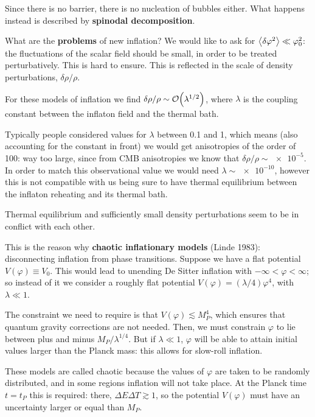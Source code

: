 \documentclass[main.tex]{subfiles}
\begin{document}
Since there is no barrier, there is no nucleation of bubbles either.
What happens instead is described by \textbf{spinodal decomposition}.

What are the \textbf{problems} of new inflation?
We would like to ask for \(\expval{ \delta \varphi^2} \ll \varphi_0^2\): the fluctuations of the scalar field should be small, in order to be treated perturbatively. 
This is hard to ensure. This is reflected in the scale of density perturbations, \(\delta \rho / \rho \). 

For these models of inflation we find \(\delta \rho / \rho \sim \order{\lambda^{1/2}}\), where \(\lambda \) is the coupling constant between the inflaton field and the thermal bath.

Typically people considered values for \(\lambda \) between \num{.1} and \num{1}, which means (also accounting for the constant in front) we would get anisotropies of the order of 100:
way too large, since from CMB anisotropies we know that \(\delta \rho / \rho \sim \num{e-5}\).
In order to match this observational value we would need \(\lambda \sim \num{e-10}\), however this is not compatible with us being sure to have thermal equilibrium between the inflaton reheating and its thermal bath. 

Thermal equilibrium and sufficiently small density perturbations seem to be in conflict with each other. 

This is the reason why \textbf{chaotic inflationary models} (Linde 1983): disconnecting inflation from phase transitions. 
Suppose we have a flat potential \(V(\varphi ) \equiv V_0 \). 
This would lead to unending De Sitter inflation with \(- \infty < \varphi < \infty \); so instead of it we consider a roughly flat potential \(V(\varphi ) = (\lambda /4) \varphi^{4}\), with \(\lambda \ll 1\). 

The constraint we need to require is that \(V(\varphi ) \lesssim M_P^{4}\), which ensures that quantum gravity corrections are not needed.
Then, we must constrain \(\varphi \) to lie between plus and minus \(M_P / \lambda^{1/4}\). 
But if \(\lambda \ll 1\), \(\varphi \) will be able to attain initial values larger than the Planck mass: this allows for slow-roll inflation. 

These models are called chaotic because the values of \(\varphi \) are taken to be randomly distributed, and in some regions inflation will not take place. 
At the Planck time \(t = t_P\) this is required: there, \(\Delta E \Delta T \gtrsim 1\), so the potential \(V(\varphi )\) must have an uncertainty larger or equal than \(M_P\). 
\end{document}
